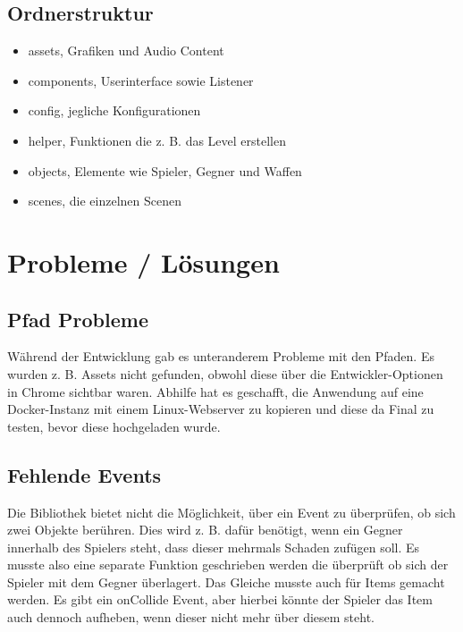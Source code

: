 \documentclass[12pt,a4paper]{article}
\begin{document}
\subsection{Ordnerstruktur}
\begin{itemize}
    \item assets, Grafiken und Audio Content
    \item components, Userinterface sowie Listener
    \item config, jegliche Konfigurationen
    \item helper, Funktionen die z. B. das Level erstellen
    \item objects, Elemente wie Spieler, Gegner und Waffen
    \item scenes, die einzelnen Scenen
\end{itemize}

\section{Probleme / Lösungen}
\subsection{Pfad Probleme}
Während der Entwicklung gab es unteranderem Probleme mit den Pfaden. Es wurden z. B. Assets nicht gefunden, obwohl diese über die Entwickler-Optionen in Chrome sichtbar waren. Abhilfe hat es geschafft, die Anwendung auf eine Docker-Instanz mit einem Linux-Webserver zu kopieren und diese da Final zu testen, bevor diese hochgeladen wurde.

\subsection{Fehlende Events}
Die Bibliothek bietet nicht die Möglichkeit, über ein Event zu überprüfen, ob sich zwei Objekte berühren. Dies wird z. B. dafür benötigt, wenn ein Gegner innerhalb des Spielers steht, dass dieser mehrmals Schaden zufügen soll. Es musste also eine separate Funktion geschrieben werden die überprüft ob sich der Spieler mit dem Gegner überlagert. Das Gleiche musste auch für Items gemacht werden. Es gibt ein onCollide Event, aber hierbei könnte der Spieler das Item auch dennoch aufheben, wenn dieser nicht mehr über diesem steht.
\end{document}
